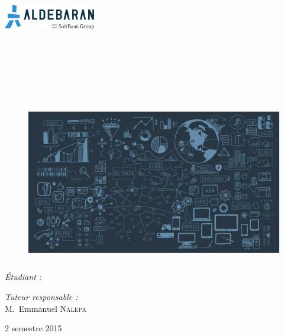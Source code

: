 \begin{center}

\begin{minipage}[t]{1.1\textwidth}
  \begin{flushright}
    \includegraphics [width=40mm,height=12mm]{images/aldebaran_logo.png} \\[0.5cm]
  \end{flushright}
\end{minipage} \\[2cm]

\textsc{\Large \reportsubject}\\[1cm]
\HRule \\[0.25cm]
\textsc{\Large \reporttitle}
{
\HRule \\[2cm]
\begin{figure}[h]
	\centering\includegraphics[width=14cm,height=7cm]{images/main_picture.png}
\end{figure}
\bigbreak\bigbreak\bigbreak\bigbreak
\begin{minipage}[t]{0.3\textwidth}
  \begin{flushleft} \large
    \emph{\Large{Étudiant :}}\\ 
    \reportauthor
  \end{flushleft}
\end{minipage}
\begin{minipage}[ht]{0.6\textwidth}
  \begin{flushright} \large
    \emph{\Large{Tuteur responsable :}} \\
    \Large{M.~Emmanuel \textsc{Nalepa}}
  \end{flushright}
\end{minipage}
}
\vfill

{\large 2 semestre 2015}

\thispagestyle{empty} %

\end{center}

